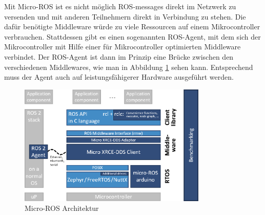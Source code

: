 \begin{flushleft}
\begin{description}
        Mit Micro-ROS ist es nicht möglich ROS-messages direkt im Netzwerk zu versenden und mit anderen Teilnehmern direkt in Verbindung zu stehen.
        Die dafür benötigte Middleware würde zu viele Ressourcen auf einem Mikrocontroller verbrauchen. 
        Stattdessen gibt es einen sogenannten ROS-Agent, mit dem sich der Mikrocontroller mit Hilfe einer für Mikrocontroller optimierten Middleware verbindet.
        Der ROS-Agent ist dann im Prinzip eine Brücke zwischen den verschiedenen Middlewares, wie man in Abbildung \ref{fig:micro-ros-architecture} sehen kann. Entsprechend muss der Agent auch auf leistungsfähigerer Hardware ausgeführt werden.    
        \cite{micro_ros_concepts}
        \begin{figure}[h!]
            \centering
            \includegraphics[width=0.8\textwidth]{imgs/Grundbegriffe/micro-ROS_architecture.png}
            \caption{Micro-ROS Architektur}
            \label{fig:micro-ros-architecture}%
        \end{figure}

        

        \end{description}
\end{flushleft}